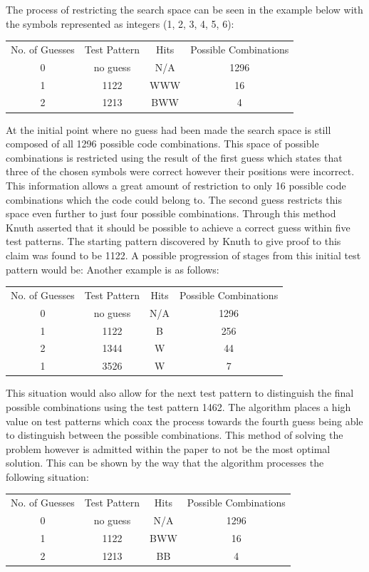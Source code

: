 \documentclass[12pt]{article}  %
\theoremstyle{definition}
\theoremstyle{remark}
\begin{document}
The process of restricting the search space can be seen in the example below with the symbols represented as integers (1, 2, 3, 4, 5, 6):
\\
{
\centering
\begin{tabular}{cccc}
No. of Guesses & Test Pattern &  Hits  & Possible Combinations \\
0 & no guess & N/A & 1296 \\
1 & 1122 &  WWW  &  16 \\
2 & 1213 &  BWW  &  4 \\
\end {tabular} \par 
} 
At the initial point where no guess had been made the search space is still composed of all 1296 possible code combinations. This space of possible combinations is restricted using the result of the first guess which states that three of the chosen symbols were correct however their positions were incorrect. This information allows a great amount of restriction to only 16 possible code combinations which the code could belong to. The second guess restricts this space even further to just four possible combinations. Through this method Knuth asserted that it should be possible to achieve a correct guess within five test patterns. The starting pattern discovered by Knuth to give proof to this claim was found to be 1122. A possible progression of stages from this initial test pattern would be:
Another example is as follows:
\\
{
\centering
\begin{tabular}{cccc}
No. of Guesses & Test Pattern &  Hits  & Possible Combinations \\
0 & no guess & N/A & 1296 \\
1 & 1122 &  B  &  256 \\
2 & 1344 &  W  &  44 \\
1 & 3526 &  W  &  7 \\
\end {tabular} \par 
}
This situation would also allow for the next test pattern to distinguish the final possible combinations using the test pattern 1462. The algorithm places a high value on test patterns which coax the process towards the fourth guess being able to distinguish between the possible combinations. This method of solving the problem however is admitted within the paper to not be the most optimal solution. This can be shown by the way that the algorithm processes the following situation:
\\
{
\centering
\begin{tabular}{cccc}
No. of Guesses & Test Pattern &  Hits  & Possible Combinations \\
0 & no guess & N/A & 1296 \\
1 & 1122 &  BWW  &  16 \\
2 & 1213 &  BB  &  4 \\
\end {tabular} \par 
} 
\end{document}
